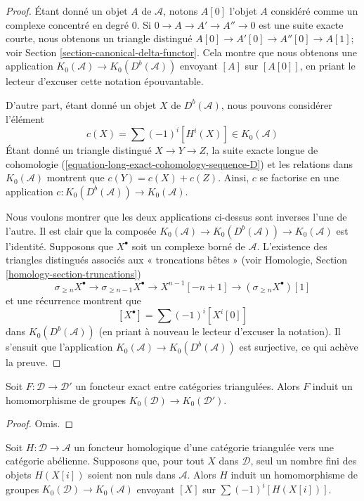\begin{proof}
Étant donné un objet $A$ de $\mathcal{A}$, notons $A[0]$ l'objet $A$
considéré comme un complexe concentré en degré $0$.
Si $0 \to A \to A' \to A'' \to 0$ est une suite exacte courte, nous obtenons
un triangle distingué $A[0] \to A'[0] \to A''[0] \to A[1]$; voir
Section \ref{section-canonical-delta-functor}.
Cela montre que nous obtenons une application
$K_0(\mathcal{A}) \to K_0(D^b(\mathcal{A}))$ envoyant $[A]$ sur $[A[0]]$,
en priant le lecteur d'excuser cette notation épouvantable.

\medskip\noindent
D'autre part, étant donné un objet $X$ de $D^b(\mathcal{A})$, nous pouvons
considérer l'élément
$$
c(X) = \sum (-1)^i[H^i(X)] \in K_0(\mathcal{A})
$$
Étant donné un triangle distingué $X \to Y \to Z$, la suite exacte longue
de cohomologie (\ref{equation-long-exact-cohomology-sequence-D}) et les
relations dans $K_0(\mathcal{A})$ montrent que $c(Y) = c(X) + c(Z)$.
Ainsi, $c$ se factorise en une application
$c : K_0(D^b(\mathcal{A})) \to K_0(\mathcal{A})$.

\medskip\noindent
Nous voulons montrer que les deux applications ci-dessus sont inverses l'une
de l'autre. Il est clair que la composée $K_0(\mathcal{A}) \to
K_0(D^b(\mathcal{A})) \to K_0(\mathcal{A})$ est l'identité.
Supposons que $X^\bullet$ soit un complexe borné de $\mathcal{A}$.
L'existence des triangles distingués associés aux « troncations bêtes » (voir
Homologie, Section \ref{homology-section-truncations})
$$
\sigma_{\geq n}X^\bullet \to \sigma_{\geq n - 1}X^\bullet \to
X^{n - 1}[-n + 1] \to (\sigma_{\geq n}X^\bullet)[1]
$$
et une récurrence montrent que
$$
[X^\bullet] = \sum (-1)^i[X^i[0]]
$$
dans $K_0(D^b(\mathcal{A}))$ (en priant à nouveau le lecteur d'excuser la
notation). Il s'ensuit que l'application
$K_0(\mathcal{A}) \to K_0(D^b(\mathcal{A}))$ est surjective, ce qui achève
la preuve.
\end{proof}

\begin{lemma}
\label{lemma-map-K}
Soit $F : \mathcal{D} \to \mathcal{D}'$ un foncteur exact entre catégories
triangulées. Alors $F$ induit un homomorphisme de groupes
$K_0(\mathcal{D}) \to K_0(\mathcal{D}')$.
\end{lemma}

\begin{proof}
Omis.
\end{proof}

\begin{lemma}
\label{lemma-homological-map-K}
Soit $H : \mathcal{D} \to \mathcal{A}$ un foncteur homologique d'une catégorie
triangulée vers une catégorie abélienne. Supposons que, pour tout $X$ dans
$\mathcal{D}$, seul un nombre fini des objets $H(X[i])$ soient non nuls dans
$\mathcal{A}$. Alors $H$ induit un homomorphisme de groupes
$K_0(\mathcal{D}) \to K_0(\mathcal{A})$ envoyant $[X]$ sur
$\sum (-1)^i[H(X[i])]$.
\end{lemma}

